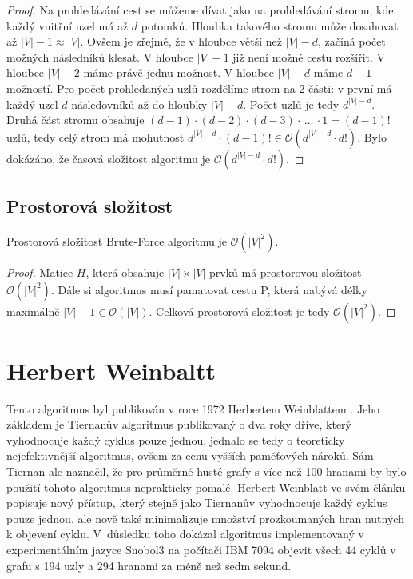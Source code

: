         \begin{proof}
            Na prohledávání cest se můžeme dívat jako na prohledávání stromu, kde každý vnitřní uzel má až $d$ potomků. Hloubka takového stromu může dosahovat až $|V| - 1 \approx |V|$. Ovšem je zřejmé, že v hloubce větší než $|V| - d$, začíná počet možných následníků klesat. V hloubce $|V| -1$ již není možné cestu rozšířit. V hloubce $|V| -2$ máme právě jednu možnost. V hloubce $|V| - d$ máme $d - 1$ možností. Pro počet prohledaných uzlů rozdělíme strom na 2 části: v první má každý uzel $d$ následovníků až do hloubky $|V| - d$. Počet uzlů je tedy $d^{|V|-d}$. Druhá část stromu obsahuje $(d-1) \cdot (d-2) \cdot (d-3) \cdot\, \dots\, \cdot 1 = (d-1)!$ uzlů, tedy celý strom má mohutnost $d^{|V|-d} \cdot (d-1)! \in \mathcal{O}(d^{|V|-d} \cdot d!)$. Bylo dokázáno, že časová složitost algoritmu je $\mathcal{O}(d^{|V|-d} \cdot d!)$.
        \end{proof}

    \section{Prostorová složitost}
        \begin{theorem}
            Prostorová složitost Brute-Force algoritmu je $\mathcal{O}(|V|^{2})$.
        \end{theorem}

        \begin{proof}
            Matice $H$, která obsahuje $|V| \times |V|$ prvků má prostorovou složitost $\mathcal{O}(|V|^2)$. Dále si algoritmus musí pamatovat cestu P, která nabývá délky maximálně $|V|-1 \in \mathcal{O}(|V|)$. Celková prostorová složitost je tedy $\mathcal{O}(|V|^{2})$.
        \end{proof}

\chapter{Herbert Weinbaltt}
    \label{chapter:Algo2}
    Tento algoritmus byl publikován v roce 1972 Herbertem Weinblattem \cite{A_new_search_algorithm}. Jeho základem je Tiernanův algoritmus \cite{Tiernan} publikovaný o dva roky dříve, který vyhodnocuje každý cyklus pouze jednou, jednalo se tedy o teoreticky nejefektivnější algoritmus, ovšem za cenu vyšších paměťových nároků. Sám Tiernan ale naznačil, že pro průměrně husté grafy s více než 100 hranami by bylo použití tohoto algoritmus neprakticky pomalé. Herbert Weinblatt ve svém článku popisuje nový přístup, který stejně jako Tiernanův vyhodnocuje každý cyklus pouze jednou, ale nově také minimalizuje množství prozkoumaných hran nutných k objevení cyklu. V~důsledku toho dokázal algoritmus implementovaný v experimentálním jazyce Snobol3 na počítači IBM 7094 objevit všech 44 cyklů v grafu s 194 uzly a 294 hranami za méně než sedm sekund.

